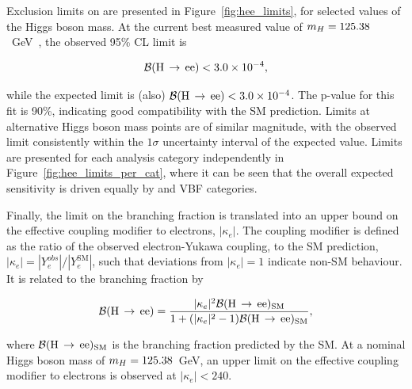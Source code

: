 Exclusion limits on \BHee are presented in Figure~\ref{fig:hee_limits}, for selected values of the Higgs boson mass. At the current best measured value of $m_{H}=125.38$~GeV~\cite{CMS_Hgg_Hmass}, the observed 95\% CL limit is

\begin{equation}
   \mathcal{B}(\mathrm{H}\,\rightarrow\,\mathrm{ee}) < 3.0\times 10^{-4},
\end{equation}

\noindent while the expected limit is (also) $\mathcal{B}(\mathrm{H}\,\rightarrow\,\mathrm{ee}) < 3.0\times 10^{-4}$. The p-value for this fit is 90\%, indicating good compatibility with the SM prediction. Limits at alternative Higgs boson mass points are of similar magnitude, with the observed limit consistently within the $1\sigma$ uncertainty interval of the expected value.  Limits are presented for each analysis category independently in Figure~\ref{fig:hee_limits_per_cat}, where it can be seen that the overall expected sensitivity is driven equally by \ggH and VBF categories.

Finally, the limit on the \Hee branching fraction is translated into an upper bound on the effective coupling modifier to electrons, $|\kappa_{e}|$. The coupling modifier is defined as the ratio of the observed electron-Yukawa coupling, to the SM prediction, $|\kappa_{e}|=|Y_{e}^{obs}|/|Y_{e}^{\mathrm{SM}}|$, such that deviations from $|\kappa_{e}|=1$ indicate non-SM behaviour. It is related to the \Hee branching fraction by

\begin{equation}
    \mathcal{B}(\mathrm{H}\,\rightarrow\,\mathrm{ee}) = \frac{|\kappa_{e}|^{2} \mathcal{B}(\mathrm{H}\,\rightarrow\,\mathrm{ee})_{\mathrm{SM}}}{1+(|\kappa_{e}|^{2}-1)\mathcal{B}(\mathrm{H}\,\rightarrow\,\mathrm{ee})_{\mathrm{SM}}},
\end{equation}

\noindent where $\mathcal{B}(\mathrm{H}\,\rightarrow\,\mathrm{ee})_{\mathrm{SM}}$ is the \Hee branching fraction predicted by the SM. At a nominal Higgs boson mass of $m_{H}=125.38$~GeV, an upper limit on the effective coupling modifier to electrons is observed at $|\kappa_{e}|<240$. 

